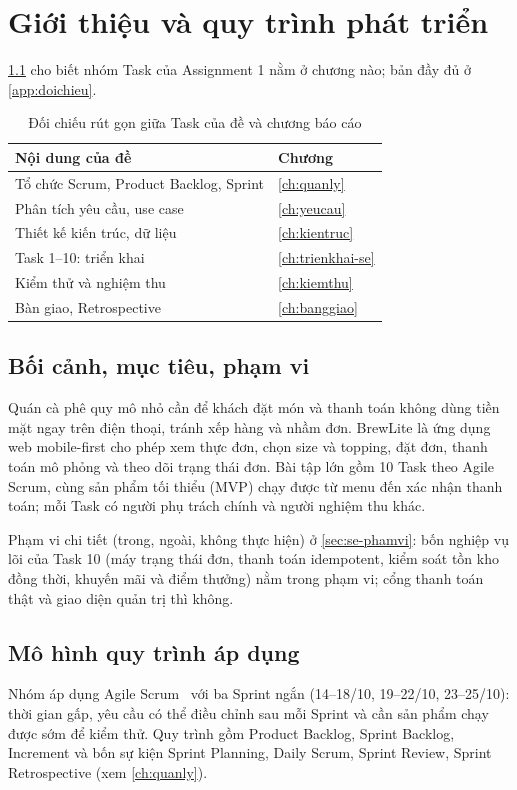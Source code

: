 \chapter{Giới thiệu và quy trình phát triển}\label{ch:gioithieu}
\cref{tab:doichieu-rutgon} cho biết nhóm Task của Assignment 1 nằm ở chương nào; bản đầy đủ ở \cref{app:doichieu}.
\begin{table}[htbp]\centering
\caption{Đối chiếu rút gọn giữa Task của đề và chương báo cáo}\label{tab:doichieu-rutgon}
\begin{tabular}{@{}p{6.4cm}p{6.6cm}@{}}\toprule
\textbf{Nội dung của đề} & \textbf{Chương} \\ \midrule
Tổ chức Scrum, Product Backlog, Sprint & \cref{ch:quanly} \\
Phân tích yêu cầu, use case & \cref{ch:yeucau} \\
Thiết kế kiến trúc, dữ liệu & \cref{ch:kientruc} \\
Task 1--10: triển khai & \cref{ch:trienkhai-se} \\
Kiểm thử và nghiệm thu & \cref{ch:kiemthu} \\
Bàn giao, Retrospective & \cref{ch:banggiao} \\ \bottomrule
\end{tabular}
\end{table}

\section{Bối cảnh, mục tiêu, phạm vi}\label{sec:se-boicanh}
Quán cà phê quy mô nhỏ cần để khách đặt món và thanh toán không dùng tiền mặt ngay trên điện thoại, tránh xếp hàng và nhầm đơn. BrewLite là ứng dụng web mobile-first cho phép xem thực đơn, chọn size và topping, đặt đơn, thanh toán mô phỏng và theo dõi trạng thái đơn. Bài tập lớn gồm 10 Task theo Agile Scrum, cùng sản phẩm tối thiểu (MVP) chạy được từ menu đến xác nhận thanh toán; mỗi Task có người phụ trách chính và người nghiệm thu khác.

Phạm vi chi tiết (trong, ngoài, không thực hiện) ở \cref{sec:se-phamvi}: bốn nghiệp vụ lõi của Task 10 (máy trạng thái đơn, thanh toán idempotent, kiểm soát tồn kho đồng thời, khuyến mãi và điểm thưởng) nằm trong phạm vi; cổng thanh toán thật và giao diện quản trị thì không.

\section{Mô hình quy trình áp dụng}\label{sec:se-quytrinh}
Nhóm áp dụng Agile Scrum~\cite{scrumguide2020} với ba Sprint ngắn (14--18/10, 19--22/10, 23--25/10): thời gian gấp, yêu cầu có thể điều chỉnh sau mỗi Sprint và cần sản phẩm chạy được sớm để kiểm thử. Quy trình gồm Product Backlog, Sprint Backlog, Increment và bốn sự kiện Sprint Planning, Daily Scrum, Sprint Review, Sprint Retrospective (xem \cref{ch:quanly}).

